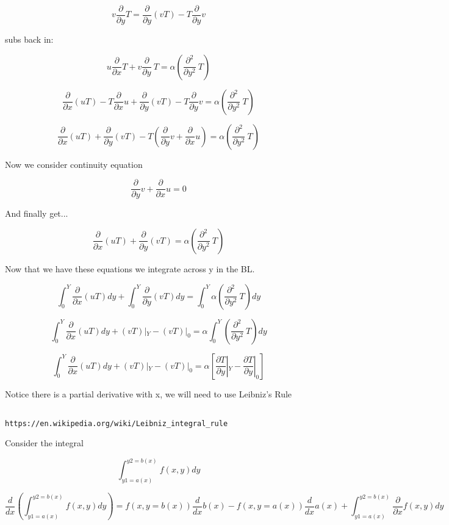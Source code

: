 \documentclass[11pt]{article}
\begin{document}
$$ v \frac{\partial}{\partial y}T =\frac{\partial}{\partial y}(vT) -T \frac{\partial}{\partial y}v  $$

subs back in:

$$ u \frac{\partial}{\partial x} T + v \frac{\partial }{\partial y} \ T  = \alpha (\frac{\partial^2 }{\partial y^2} \ T ) $$ 

$$ \frac{\partial}{\partial x}(uT)  - T \frac{\partial}{\partial x}u + \frac{\partial}{\partial y}(vT) -T \frac{\partial}{\partial y}v  = \alpha (\frac{\partial^2 }{\partial y^2} \ T ) $$ 

$$ \frac{\partial}{\partial x}(uT)   + \frac{\partial}{\partial y}(vT) -T( \frac{\partial}{\partial y}v + \frac{\partial}{\partial x}u) = \alpha (\frac{\partial^2 }{\partial y^2} \ T ) $$ 


Now we consider continuity equation

$$\frac{\partial}{\partial y}v + \frac{\partial}{\partial x}u = 0$$

And finally get...

$$ \frac{\partial}{\partial x}(uT)   + \frac{\partial}{\partial y}(vT)  = \alpha (\frac{\partial^2 }{\partial y^2} \ T ) $$ 


Now that we have these equations we integrate across y in the BL.

$$ \int_0^Y \frac{\partial}{\partial x}(uT)  dy  + \int_0^Y \frac{\partial}{\partial y}(vT) dy = \int_0^Y \alpha (\frac{\partial^2 }{\partial y^2} \ T ) dy $$ 

$$ \int_0^Y \frac{\partial}{\partial x}(uT)  dy  + (vT)|_Y - (vT)|_0 = \alpha \int_0^Y  (\frac{\partial^2 }{\partial y^2} \ T ) dy $$ 

$$ \int_0^Y \frac{\partial}{\partial x}(uT)  dy  + (vT)|_Y - (vT)|_0 = \alpha [\frac{\partial T}{\partial y}|_Y -  \frac{\partial T}{\partial y} |_0] $$ 



Notice there is a partial derivative with x, we will need to use Leibniz's Rule

\begin{verbatim}

https://en.wikipedia.org/wiki/Leibniz_integral_rule
\end{verbatim}

Consider the integral

$$\int_{y1=a(x)}^{y2=b(x)} f(x,y) dy$$

$$\frac{d}{dx} \left( \int_{y1=a(x)}^{y2=b(x)} f(x,y) dy \right)= f(x,y=b(x)) \frac{d}{dx}b(x) - f(x,y=a(x)) \frac{d}{dx} a(x)  +  \int_{y1=a(x)}^{y2=b(x)} \frac{\partial}{\partial x} f(x,y) dy $$
\end{document}
